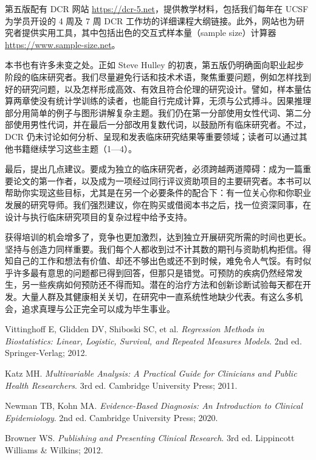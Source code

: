 第五版配有 DCR 网站 \url{https://dcr-5.net}，提供教学材料，包括我们每年在 UCSF 为学员开设的 4 周及 7 周 DCR 工作坊的详细课程大纲链接。此外，网站也为研究者提供实用工具，其中包括出色的交互式样本量（sample size）计算器 \url{https://www.sample-size.net}。

本书也有许多未变之处。正如 Steve Hulley 的初衷，第五版仍明确面向职业起步阶段的临床研究者。我们尽量避免行话和技术术语，聚焦重要问题，例如怎样找到好的研究问题，以及怎样形成高效、有效且符合伦理的研究设计。譬如，样本量估算两章使没有统计学训练的读者，也能自行完成计算，无须与公式搏斗。因果推理部分用简单的例子与图形讲解复杂主题。我们仍在第一分部使用女性代词、第二分部使用男性代词，并在最后一分部改用复数代词，以鼓励所有临床研究者。不过，DCR 仍未讨论如何分析、呈现和发表临床研究结果等重要领域；读者可以通过其他书籍继续学习这些主题（1—4）。

最后，提出几点建议。要成为独立的临床研究者，必须跨越两道障碍：成为一篇重要论文的第一作者，以及成为一项经过同行评议资助项目的主要研究者。本书可以帮助你实现这些目标，尤其是在另一个必要条件的配合下：有一位关心你和你职业发展的研究导师。我们强烈建议，你在购买或借阅本书之后，找一位资深同事，在设计与执行临床研究项目的复杂过程中给予支持。

获得培训的机会增多了，竞争也更加激烈，达到独立开展研究所需的时间也更长。坚持与创造力同样重要。我们每个人都收到过不计其数的期刊与资助机构拒信。得知自己的工作和想法有价值、却还不够出色或还不到时候，难免令人气馁。有时似乎许多最有意思的问题都已得到回答，但那只是错觉。可预防的疾病仍然经常发生，另一些疾病如何预防还不得而知。潜在的治疗方法和创新诊断试验每天都在开发。大量人群及其健康相关关切，在研究中一直系统性地缺少代表。有这么多机会，追求真理与公正完全可以成为毕生事业。

\begin{references}
\item Vittinghoff E, Glidden DV, Shiboski SC, et al. \textit{Regression Methods in Biostatistics: Linear, Logistic, Survival, and Repeated Measures Models}. 2nd ed. Springer-Verlag; 2012.
\item Katz MH. \textit{Multivariable Analysis: A Practical Guide for Clinicians and Public Health Researchers}. 3rd ed. Cambridge University Press; 2011.
\item Newman TB, Kohn MA. \textit{Evidence-Based Diagnosis: An Introduction to Clinical Epidemiology}. 2nd ed. Cambridge University Press; 2020.
\item Browner WS. \textit{Publishing and Presenting Clinical Research}. 3rd ed. Lippincott Williams \& Wilkins; 2012.
\end{references}

